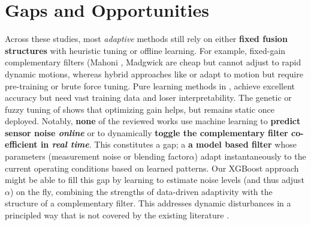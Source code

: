 \documentclass{iutbscthesis}
\begin{document}
\section{Gaps and Opportunities}
Across these studies, most \textit{adaptive} methods still rely on either \textbf{fixed fusion structures} with heuristic tuning or offline learning. For example, fixed-gain complementary filters (Mahoni \cite{mahony2008nonlinear}, Madgwick \cite{madgwick2011estimation} are cheap but cannot adjust to rapid dynamic motions, whereas hybrid approaches like \cite{vertzberger2022adaptive} or \cite{wang2020mems} adapt to motion but require pre-training or brute force tuning. Pure learning methods in \cite{denoising}, \cite{golroudbari2023cnn6DOF} achieve excellent accuracy but need vast training data and loser interpretability. The genetic or fuzzy tuning of \cite{maton2024indirectgainGA} shows that optimizing gain helps, but remains static once deployed. Notably, \textbf{none} of the reviewed works use machine learning to \textbf{predict sensor noise \textit{online}} or to dynamically \textbf{toggle the complementary filter co-efficient in \textit{real time}}. This constitutes a gap; a \textbf{a model based filter} whose parameters (measurement noise or blending factor$\alpha$) adapt instantaneously to the current operating conditions based on learned patterns. Our XGBoost approach might be able to fill this gap by learning to estimate noise levels (and thus adjust $\alpha$) on the fly, combining the strengths of data-driven adaptivity with the structure of a complementary filter. This addresses dynamic disturbances in a principled way that is not covered by the existing literature \cite{vertzberger2022adaptive} \cite{denoising}. 
\end{document}
